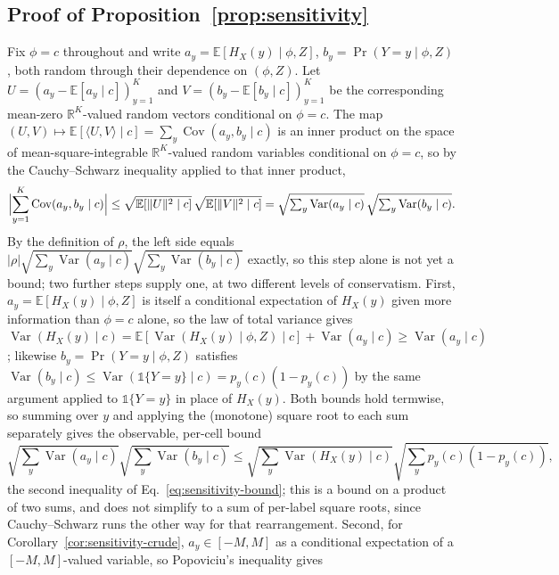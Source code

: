 \documentclass[preprint,times,10pt,a4paper]{elsarticle}
\newcommand{\ind}{\mathds{1}}
\theoremstyle{plain}
\theoremstyle{definition}
\begin{document}
\subsection{Proof of Proposition~\ref{prop:sensitivity}}
Fix $\phi=c$ throughout and write $a_y=\mathbb E[H_X(y)\mid\phi,Z]$,
$b_y=\Pr(Y=y\mid\phi,Z)$, both random through their dependence on $(\phi,Z)$. Let
$U=(a_y-\mathbb E[a_y\mid c])_{y=1}^K$ and $V=(b_y-\mathbb E[b_y\mid c])_{y=1}^K$ be the
corresponding mean-zero $\mathbb R^K$-valued random vectors conditional on $\phi=c$. The
map $(U,V)\mapsto\mathbb E[\langle U,V\rangle\mid c]=\sum_y\operatorname{Cov}(a_y,b_y\mid c)$
is an inner product on the space of mean-square-integrable $\mathbb R^K$-valued random
variables conditional on $\phi=c$, so by the Cauchy--Schwarz inequality applied to that
inner product,
\[
\Bigl|\sum_{y=1}^K\operatorname{Cov}(a_y,b_y\mid c)\Bigr|
\le\sqrt{\mathbb E[\lVert U\rVert^2\mid c]}\,\sqrt{\mathbb E[\lVert V\rVert^2\mid c]}
=\sqrt{\textstyle\sum_y\operatorname{Var}(a_y\mid c)}\,\sqrt{\textstyle\sum_y\operatorname{Var}(b_y\mid c)}.
\]
By the definition of $\rho$, the left side equals
$|\rho|\sqrt{\sum_y\operatorname{Var}(a_y\mid c)}\sqrt{\sum_y\operatorname{Var}(b_y\mid c)}$
exactly, so this step alone is not yet a bound; two further steps supply one, at two
different levels of conservatism. First, $a_y=\mathbb E[H_X(y)\mid\phi,Z]$ is itself a
conditional expectation of $H_X(y)$ given more information than $\phi=c$ alone, so the
law of total variance gives $\operatorname{Var}(H_X(y)\mid c)=\mathbb
E[\operatorname{Var}(H_X(y)\mid\phi,Z)\mid c]+\operatorname{Var}(a_y\mid c)\ge
\operatorname{Var}(a_y\mid c)$; likewise $b_y=\Pr(Y=y\mid\phi,Z)$ satisfies
$\operatorname{Var}(b_y\mid c)\le\operatorname{Var}(\ind\{Y=y\}\mid c)=p_y(c)(1-p_y(c))$ by
the same argument applied to $\ind\{Y=y\}$ in place of $H_X(y)$. Both bounds hold
termwise, so summing over $y$ and applying the (monotone) square root to each sum
separately gives the observable, per-cell bound
\[
\sqrt{\textstyle\sum_y\operatorname{Var}(a_y\mid c)}\sqrt{\textstyle\sum_y\operatorname{Var}(b_y\mid c)}
\le\sqrt{\textstyle\sum_y\operatorname{Var}(H_X(y)\mid c)}\sqrt{\textstyle\sum_yp_y(c)(1-p_y(c))},
\]
the second inequality of Eq.~\eqref{eq:sensitivity-bound}; this is a bound on a product of
two sums, and does not simplify to a sum of per-label square roots, since Cauchy--Schwarz
runs the other way for that rearrangement. Second, for
Corollary~\ref{cor:sensitivity-crude}, $a_y\in[-M,M]$ as a conditional expectation of a
$[-M,M]$-valued variable, so Popoviciu's inequality gives
\end{document}
